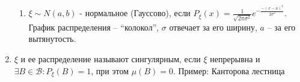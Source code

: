 \begin{enumerate}[label=\Roman*.]
\begin{enumerate}[label=\arabic*.]
    \item $\xi \sim N(a, b)$ - нормальное (Гауссово), если $P_{\xi}(x)= \frac{1}{\sqrt{2 \pi \sigma^2}} e^{-\frac{-(x-a)^2}{2\sigma^2}}$.
    График распределения -- ``колокол'', $\sigma$ отвечает за его ширину, $a$ -- за его вытянутость.

    \end{enumerate}
    
    \item $\xi$ и ее распределение называют сингулярным, если $\xi$ непрерывна и $\exists B \in \mathcal{B}\colon P_{\xi}(B) = 1$, при этом $\mu(B) = 0$.
    Пример: Канторова лестница
\end{enumerate}